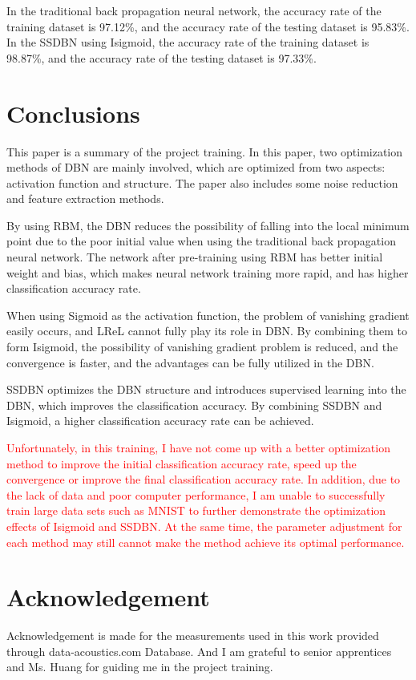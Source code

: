 \documentclass{bioinfo}
\begin{document}
In the traditional back propagation neural network, the accuracy rate of the training dataset is 97.12\%, and the accuracy rate of the testing dataset is 95.83\%. In the SSDBN using Isigmoid, the accuracy rate of the training dataset is 98.87\%, and the accuracy rate of the testing dataset is 97.33\%.

\section{Conclusions}
This paper is a summary of the project training. In this paper, two optimization methods of DBN are mainly involved, which are optimized from two aspects: activation function and structure. The paper also includes some noise reduction and feature extraction methods.

By using RBM, the DBN reduces the possibility of falling into the local minimum point due to the poor initial value when using the traditional back propagation neural network. The network after pre-training using RBM has better initial weight and bias, which makes neural network training more rapid, and has higher classification accuracy rate.

When using Sigmoid as the activation function, the problem of vanishing gradient easily occurs, and LReL cannot fully play its role in DBN. By combining them to form Isigmoid, the possibility of vanishing gradient problem is reduced, and the convergence is faster, and the advantages can be fully utilized in the DBN.

SSDBN optimizes the DBN structure and introduces supervised learning into the DBN, which improves the classification accuracy. By combining SSDBN and Isigmoid, a higher classification accuracy rate can be achieved.

\textcolor{red}{Unfortunately, in this training, I have not come up with a better optimization method to improve the initial classification accuracy rate, speed up the convergence or improve the final classification accuracy rate. In addition, due to the lack of data and poor computer performance, I am unable to successfully train large data sets such as MNIST to further demonstrate the optimization effects of Isigmoid and SSDBN. At the same time, the parameter adjustment for each method may still cannot make the method achieve its optimal performance.}


\section*{Acknowledgement}
Acknowledgement is made for the measurements used in this work provided through data-acoustics.com Database. And I am grateful to senior apprentices and Ms. Huang for guiding me in the project training.




 
\end{document}
